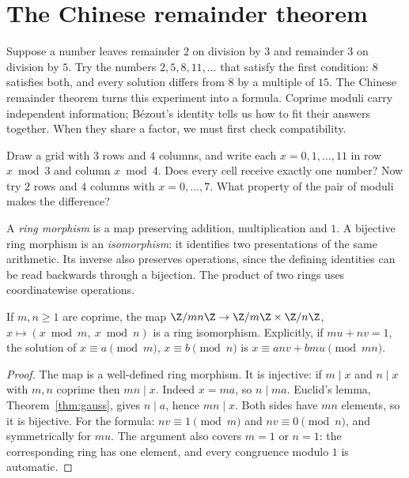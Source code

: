 \section{The Chinese remainder theorem}

Suppose a number leaves remainder $2$ on division by $3$ and remainder $3$ on division by $5$. Try the numbers $2,5,8,11,\ldots$ that satisfy the first condition: $8$ satisfies both, and every solution differs from $8$ by a multiple of $15$. The Chinese remainder theorem turns this experiment into a formula. Coprime moduli carry independent information; B\'ezout's identity tells us how to fit their answers together. When they share a factor, we must first check compatibility.

\begin{think}
Draw a grid with $3$ rows and $4$ columns, and write each $x=0,1,\dots,11$ in row $x\bmod3$ and column $x\bmod4$. Does every cell receive exactly one number? Now try $2$ rows and $4$ columns with $x=0,\dots,7$. What property of the pair of moduli makes the difference?
\end{think}

A \emph{ring morphism} is a map preserving addition, multiplication and
$1$. A bijective ring morphism is an \emph{isomorphism}: it identifies two
presentations of the same arithmetic. Its inverse also preserves operations,
since the defining identities can be read backwards through a bijection.
The product of two rings uses coordinatewise operations.

\begin{theorem}\label{thm:crt}
If $m,n\ge1$ are coprime, the map $\Z/mn\Z\to\Z/m\Z\times\Z/n\Z$, $x\mapsto(x\bmod m,\ x\bmod n)$ is a ring isomorphism. Explicitly, if $mu+nv=1$, the solution of $x\equiv a\pmod m$, $x\equiv b\pmod n$ is $x\equiv anv+bmu\pmod{mn}$.
\end{theorem}
\begin{proof}
The map is a well-defined ring morphism. It is injective: if $m\mid x$ and $n\mid x$ with $m,n$ coprime then $mn\mid x$. Indeed $x=ma$, so $n\mid ma$. Euclid's lemma, Theorem~\ref{thm:gauss}, gives $n\mid a$, hence $mn\mid x$. Both sides have $mn$ elements, so it is bijective. For the formula: $nv\equiv1\pmod m$ and $nv\equiv0\pmod n$, and symmetrically for $mu$. The argument also covers $m=1$ or $n=1$: the corresponding ring has one element, and every congruence modulo $1$ is automatic.
\end{proof}

